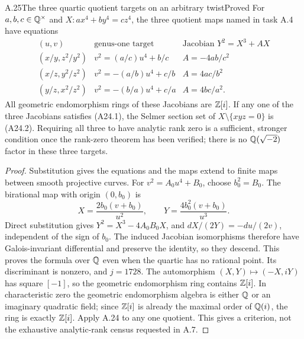 \begin{statement}{A.25}{The three quartic quotient targets on an arbitrary twist}{Proved}
For $a,b,c\in\mathbb Q^\times$ and $X:a x^4+b y^4=c z^4$, the three quotient maps named in task A.4 have equations
\[
\begin{array}{c|c|c}
(u,v)&\text{genus-one target}&\text{Jacobian }Y^2=X^3+AX\\\hline
(x/y,z^2/y^2)&v^2=(a/c)u^4+b/c&A=-4ab/c^2\\
(x/z,y^2/z^2)&v^2=-(a/b)u^4+c/b&A=4ac/b^2\\
(y/z,x^2/z^2)&v^2=-(b/a)u^4+c/a&A=4bc/a^2.
\end{array}
\tag{A25.1}
\]
All geometric endomorphism rings of these Jacobians are $\mathbb Z[i]$. If any one of the three Jacobians satisfies (A24.1), the Selmer section set of $X\setminus\{xyz=0\}$ is (A24.2). Requiring all three to have analytic rank zero is a sufficient, stronger condition once the rank-zero theorem has been verified; there is no $\mathbb Q(\sqrt{-2})$ factor in these three targets.
\end{statement}
\begin{proof}
Substitution gives the equations and the maps extend to finite maps between smooth projective curves. For $v^2=A_0u^4+B_0$, choose $b_0^2=B_0$. The birational map with origin $(0,b_0)$ is
\[
X=\frac{2b_0(v+b_0)}{u^2},\qquad Y=\frac{4b_0^2(v+b_0)}{u^3}.
\]
Direct substitution gives $Y^2=X^3-4A_0B_0X$, and $dX/(2Y)=-du/(2v)$, independent of the sign of $b_0$. The induced Jacobian isomorphisms therefore have Galois-invariant differential and preserve the identity, so they descend. This proves the formula over $\mathbb Q$ even when the quartic has no rational point. Its discriminant is nonzero, and $j=1728$. The automorphism $(X,Y)\mapsto(-X,iY)$ has square $[-1]$, so the geometric endomorphism ring contains $\mathbb Z[i]$. In characteristic zero the geometric endomorphism algebra is either $\mathbb Q$ or an imaginary quadratic field; since $\mathbb Z[i]$ is already the maximal order of $\mathbb Q(i)$, the ring is exactly $\mathbb Z[i]$. Apply A.24 to any one quotient. This gives a criterion, not the exhaustive analytic-rank census requested in A.7.
\end{proof}

